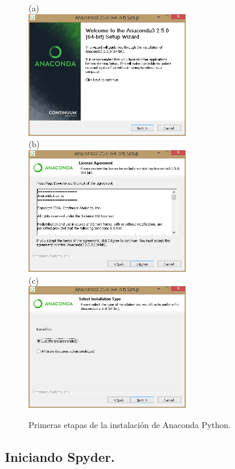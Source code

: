 \documentclass[10pt,a4paper]{article}\usepackage[]{graphicx}\usepackage[]{color}
\begin{document}
\begin{figure}[tbh]
\begin{center}
(a)\\[1cm]
\includegraphics[width=7cm]{../fig/Tut-00-py-03-Anaconda.png}\\[1cm]
(b)\\[1cm]
\includegraphics[width=7cm]{../fig/Tut-00-py-04-Anaconda.png}\\[1cm]
(c)\\[1cm]
\includegraphics[width=7cm]{../fig/Tut-00-py-05-Anaconda.png}\\[1cm]
\caption{Primeras etapas de la instalación de Anaconda Python.}
\label{cap01:fig:Tut-00-py-03-Anaconda}
\end{center}
\end{figure}

\newpage

\subsection{Iniciando Spyder.}
\label{tut02py:subsec:iniciandoConsolaJupyter}
\end{document}
